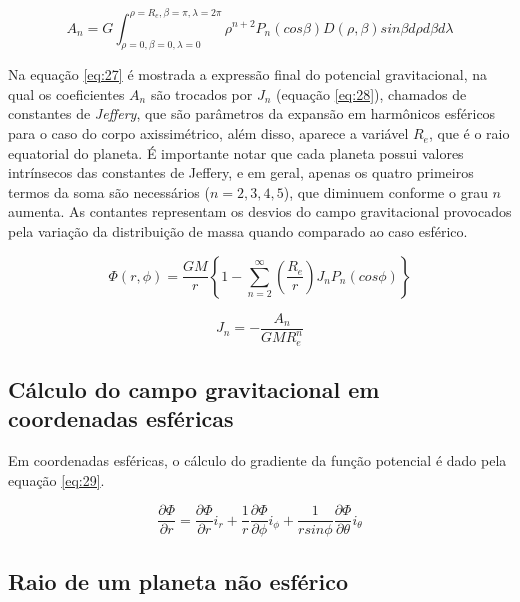 \begin{equation}
    A_{n} = G \int_{\rho = 0, \beta = 0, \lambda = 0}^{\rho = R_{e}, \beta = \pi, \lambda = 2\pi}    \rho^{n+2}P_{n}(cos \beta)D(\rho , \beta )sin \beta d\rho d \beta d \lambda
    \label{eq:26}
\end{equation}

Na equação \ref{eq:27} é mostrada a expressão final do potencial gravitacional, na qual os coeficientes $A_{n}$ são trocados por $J_{n}$ (equação \ref{eq:28}), chamados de constantes de \textit{Jeffery}, que são parâmetros da expansão em harmônicos esféricos para o caso do corpo axissimétrico, além disso, aparece a variável $R_{e}$, que é o raio equatorial do planeta. É importante notar que cada planeta possui valores intrínsecos das constantes de Jeffery, e em geral, apenas os quatro primeiros termos da soma são necessários ($n = 2, 3, 4, 5 $), que diminuem conforme o grau $n$ aumenta. As contantes representam os desvios do campo gravitacional provocados pela variação da distribuição de massa quando comparado ao caso esférico. 

\begin{equation}
    \Phi(r,\phi) = \frac{GM}{r} \left\{ 1 - \sum\limits_{n=2}^{\mbox{$\infty$}} \left( \frac{R_{e}}{r}         \right)  J_{n} P_{n} (cos \phi) \right\}
    \label{eq:27}
\end{equation}

\begin{equation}
    J_{n} = -\frac{A_{n}}{GMR_{e}^{n}}
\label{eq:28}
\end{equation}

\subsection{Cálculo do campo gravitacional em coordenadas esféricas}

Em coordenadas esféricas, o cálculo do gradiente da função potencial é dado pela equação \ref{eq:29}.

\begin{equation}
    \frac{\partial \Phi}{\partial r} = \frac{\partial \Phi}{\partial r}i_{r} + \frac{1}{r} \frac{\partial \Phi}{\partial \phi}i_{\phi} + \frac{1}{r sin\phi}\frac{\partial \Phi}{\partial \theta}i_{\theta}
    \label{eq:29}
\end{equation}

\subsection{Raio de um planeta não esférico}

